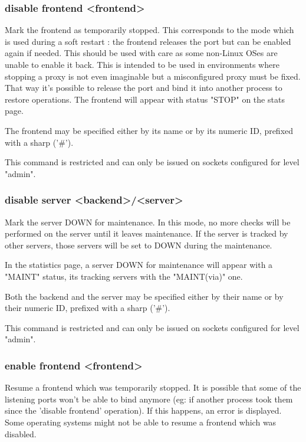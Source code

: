 \subsubsection[disable frontend]{disable frontend <frontend>}
  Mark the frontend as temporarily stopped. This corresponds to the mode which
  is used during a soft restart : the frontend releases the port but can be
  enabled again if needed. This should be used with care as some non-Linux OSes
  are unable to enable it back. This is intended to be used in environments
  where stopping a proxy is not even imaginable but a misconfigured proxy must
  be fixed. That way it's possible to release the port and bind it into another
  process to restore operations. The frontend will appear with status "STOP"
  on the stats page.

  The frontend may be specified either by its name or by its numeric ID,
  prefixed with a sharp ('\#').

  This command is restricted and can only be issued on sockets configured for
  level "admin".

\subsubsection[disable server]{disable server <backend>/<server>}
  Mark the server DOWN for maintenance. In this mode, no more checks will be
  performed on the server until it leaves maintenance.
  If the server is tracked by other servers, those servers will be set to DOWN
  during the maintenance.

  In the statistics page, a server DOWN for maintenance will appear with a
  "MAINT" status, its tracking servers with the "MAINT(via)" one.

  Both the backend and the server may be specified either by their name or by
  their numeric ID, prefixed with a sharp ('\#').

  This command is restricted and can only be issued on sockets configured for
  level "admin".

\subsubsection[enable frontend]{enable frontend <frontend>}
  Resume a frontend which was temporarily stopped. It is possible that some of
  the listening ports won't be able to bind anymore (eg: if another process
  took them since the 'disable frontend' operation). If this happens, an error
  is displayed. Some operating systems might not be able to resume a frontend
  which was disabled.

